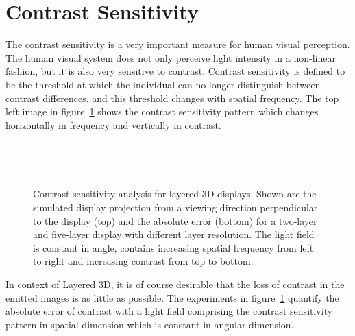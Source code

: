 \section{Contrast Sensitivity}

The contrast sensitivity is a very important measure for human visual perception.
The human visual system does not only perceive light intensity in a non-linear fashion, but it is also very sensitive to contrast.
Contrast sensitivity is defined to be the threshold at which the individual can no longer distinguish between contrast differences, and this threshold changes with spatial frequency.
The top left image in figure~\ref{fig:contrast_sensitivity} shows the contrast sensitivity pattern which changes horizontally in frequency and vertically in contrast.
\begin{figure}[tb]
	\begin{subfigure}{0.45\textwidth}
		
	\end{subfigure}\hfill%
	\begin{subfigure}{0.45\textwidth}
		
	\end{subfigure}%
	\\
	\begin{subfigure}{0.45\textwidth}
		
	\end{subfigure}\hfill%
	\begin{subfigure}{0.45\textwidth}
		
	\end{subfigure}%
	\\
	\begin{subfigure}{0.45\textwidth}
		
	\end{subfigure}\hfill%
	\begin{subfigure}{0.45\textwidth}
		
	\end{subfigure}%
	\caption[Contrast sensitivity analysis for layered 3D displays]
			{Contrast sensitivity analysis for layered 3D displays.
			 Shown are the simulated display projection from a viewing direction perpendicular to the display (top) and the absolute error (bottom) for a two-layer and five-layer display with different layer resolution.
			 The light field is constant in angle, contains increasing spatial frequency from left to right and increasing contrast from top to bottom.}
	\label{fig:contrast_sensitivity}
\end{figure}
In context of Layered 3D, it is of course desirable that the loss of contrast in the emitted images is as little as possible.
The experiments in figure~\ref{fig:contrast_sensitivity} quantify the absolute error of contrast with a light field comprising the contrast sensitivity pattern in spatial dimension which is constant in angular dimension.

